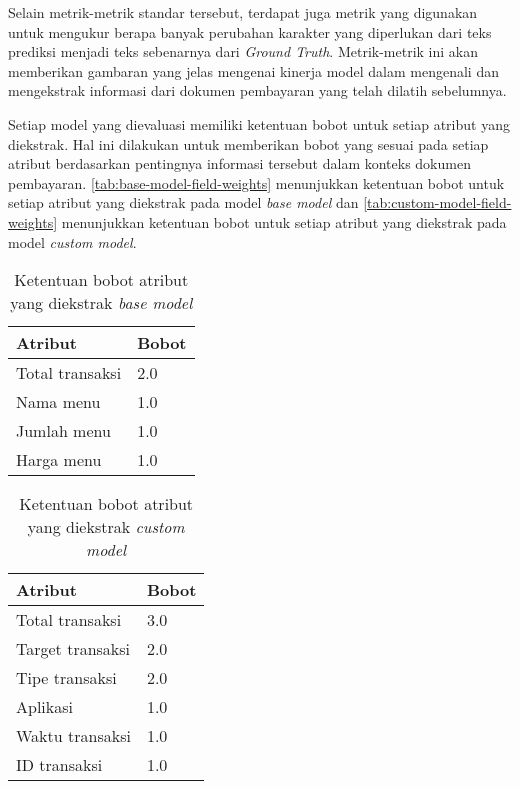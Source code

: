 Selain metrik-metrik standar tersebut, terdapat juga metrik \mcer{} yang digunakan untuk mengukur berapa banyak perubahan karakter yang diperlukan dari teks prediksi menjadi teks sebenarnya dari \emph{Ground Truth}. Metrik-metrik ini akan memberikan gambaran yang jelas mengenai kinerja model dalam mengenali dan mengekstrak informasi dari dokumen pembayaran yang telah dilatih sebelumnya.

Setiap model yang dievaluasi memiliki ketentuan bobot untuk setiap atribut yang diekstrak. Hal ini dilakukan untuk memberikan bobot yang sesuai pada setiap atribut berdasarkan pentingnya informasi tersebut dalam konteks dokumen pembayaran. \autoref{tab:base-model-field-weights} menunjukkan ketentuan bobot untuk setiap atribut yang diekstrak pada model \emph{base model} dan \autoref{tab:custom-model-field-weights} menunjukkan ketentuan bobot untuk setiap atribut yang diekstrak pada model \emph{custom model}.

\begin{table}[h!]
    \centering
    \caption{Ketentuan bobot atribut yang diekstrak \emph{base model}}
    \label{tab:base-model-field-weights}
    \begin{tabularx}{\textwidth}{|X|X|}
        \hline
        \textbf{Atribut} & \textbf{Bobot} \\ \hline
        Total transaksi & 2.0 \\ \hline
        Nama menu & 1.0 \\ \hline
        Jumlah menu & 1.0 \\ \hline
        Harga menu & 1.0 \\ \hline 
    \end{tabularx}
\end{table}

\begin{table}[h!]
    \centering
    \caption{Ketentuan bobot atribut yang diekstrak \emph{custom model}}
    \label{tab:custom-model-field-weights}
    \begin{tabularx}{\textwidth}{|X|X|}
        \hline
        \textbf{Atribut} & \textbf{Bobot} \\ \hline
        Total transaksi & 3.0 \\ \hline
        Target transaksi & 2.0 \\ \hline
        Tipe transaksi & 2.0 \\ \hline
        Aplikasi & 1.0 \\ \hline
        Waktu transaksi & 1.0 \\ \hline
        ID transaksi & 1.0 \\ \hline
    \end{tabularx}
\end{table}
